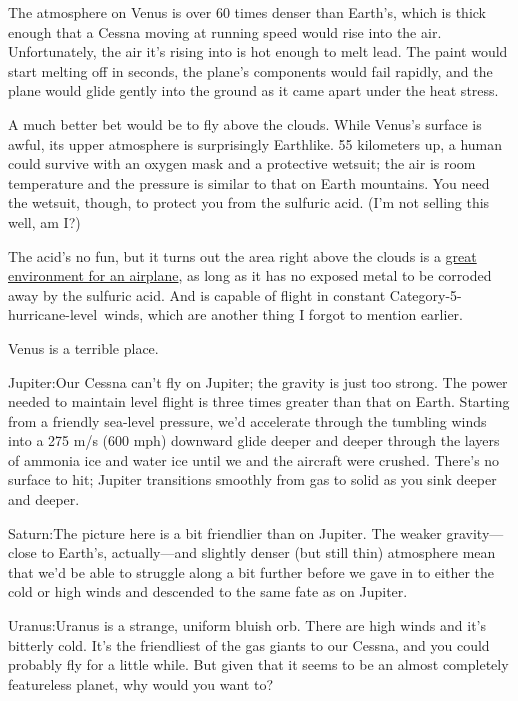 {The atmosphere on Venus is over 60 times denser than Earth’s, which is thick enough that a Cessna moving at running speed would rise into the air. Unfortunately, the air it’s rising into is hot enough to melt lead. The paint would start melting off in seconds, the plane’s components would fail rapidly, and the plane would glide gently into the ground as it came apart under the heat stress.}

{A much better bet would be to fly above the clouds. While Venus’s surface is awful, its upper atmosphere is surprisingly Earthlike. 55 kilometers up, a human could survive with an oxygen mask and a protective wetsuit; the air is room temperature and the pressure is similar to that on Earth mountains. You need the wetsuit, though, to protect you from the sulfuric acid. (I’m not selling this well, am I?)}

{The acid's no fun, but it turns out the area right above the clouds is a \href{http://ntrs.nasa.gov/archive/nasa/casi.ntrs.nasa.gov/20030003716\_2002108457.pdf}{great environment for an airplane}, as long as it has no exposed metal to be corroded away by the sulfuric acid. And is capable of flight in constant Category-5-hurricane-level winds, which are another thing I forgot to mention earlier.}

{Venus is a terrible place.}

{Jupiter:Our Cessna can’t fly on Jupiter; the gravity is just too strong. The power needed to maintain level flight is three times greater than that on Earth. Starting from a friendly sea-level pressure, we’d accelerate through the tumbling winds into a 275 m/s (600 mph) downward glide deeper and deeper through the layers of ammonia ice and water ice until we and the aircraft were crushed. There's no surface to hit; Jupiter transitions smoothly from gas to solid as you sink deeper and deeper.}

{Saturn:The picture here is a bit friendlier than on Jupiter. The weaker gravity—close to Earth’s, actually—and slightly denser (but still thin) atmosphere mean that we’d be able to struggle along a bit further before we gave in to either the cold or high winds and descended to the same fate as on Jupiter.}

{Uranus:Uranus is a strange, uniform bluish orb. There are high winds and it’s bitterly cold. It’s the friendliest of the gas giants to our Cessna, and you could probably fly for a little while. But given that it seems to be an almost completely featureless planet, why would you want to?}

